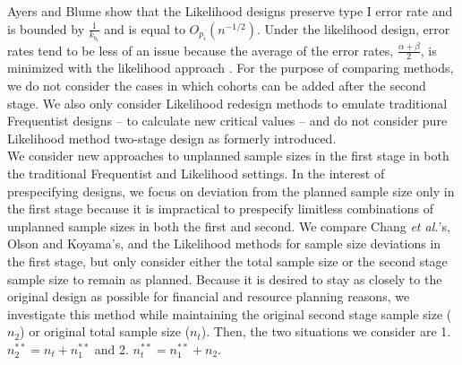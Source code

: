 \documentclass[12pt]{report}\usepackage[]{graphicx}\usepackage[]{color}
\newlength{\li}\setlength{\li}{14.48pt}
\newlength{\di}\setlength{\di}{-3.5mm}
\begin{document}
 
\indent Ayers and Blume \cite{Ayers} show that the Likelihood designs preserve type I error rate and is bounded by $\frac{1}{k_{b_t}}$ and is equal to $O_{p_i}\left({n}^{-1/2}\right)$. Under the likelihood design, error rates tend to be less of an issue because the average of the error rates, $\frac{\alpha + \beta}{2}$, is minimized with the likelihood approach \cite{Ayers}. For the purpose of comparing methods, we do not consider the cases in which cohorts can be added after the second stage. We also only consider Likelihood redesign methods to emulate traditional Frequentist designs -- to calculate new critical values -- and do not consider pure Likelihood method two-stage design as formerly introduced. \\
\indent We consider new approaches to unplanned sample sizes in the first stage in both the traditional Frequentist and Likelihood settings. In the interest of prespecifying designs, we focus on deviation from the planned sample size only in the first stage because it is impractical to prespecify limitless combinations of unplanned sample sizes in both the first and second. We compare Chang \textit{et al.}'s, Olson and Koyama's, and the Likelihood methods for sample size deviations in the first stage, but only consider either the total sample size or the second stage sample size to remain as planned.
Because it is desired to stay as closely to the original design as possible for financial and resource planning reasons, we investigate this method while maintaining the original second stage sample size ($n_2$) or original total sample size ($n_t$). Then, the two situations we consider are 1. $n_2^{\ast\ast} = n_t + n_1^{\ast\ast}$ and 2. $n_t^{\ast\ast} = n_1^{\ast\ast} + n_2$.
\end{document}
